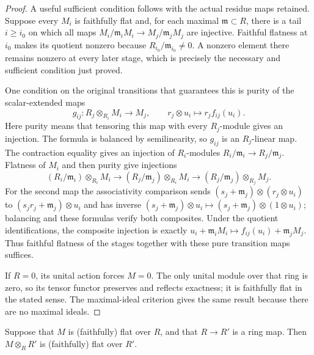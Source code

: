 \begin{proof}
A useful sufficient condition follows with the actual
residue maps retained. Suppose every $M_i$ is faithfully
flat and, for each maximal $\mathfrak m\subset R$, there
is a tail $i\geq i_0$ on which all maps
$M_i/\mathfrak m_iM_i\to M_j/\mathfrak m_jM_j$ are injective.
Faithful flatness at $i_0$ makes its quotient nonzero because
$R_{i_0}/\mathfrak m_{i_0}\ne0$. A nonzero element there
remains nonzero at every later stage, which is precisely
the necessary and sufficient condition just proved.

One condition on the original transitions that guarantees
this is purity of the scalar-extended maps
$$
g_{ij}:R_j\otimes_{R_i}M_i\longrightarrow M_j,
\qquad r_j\otimes u_i\longmapsto r_jf_{ij}(u_i).
$$
Here purity means that tensoring this map with every
$R_j$-module gives an injection. The formula is balanced
by semilinearity, so $g_{ij}$ is an $R_j$-linear map.
The contraction equality gives an injection of
$R_i$-modules $R_i/\mathfrak m_i\to R_j/\mathfrak m_j$.
Flatness of $M_i$ and then purity give injections
$$
(R_i/\mathfrak m_i)\otimes_{R_i}M_i
\longrightarrow (R_j/\mathfrak m_j)\otimes_{R_i}M_i
\longrightarrow (R_j/\mathfrak m_j)\otimes_{R_j}M_j.
$$
For the second map the associativity comparison sends
$(s_j+\mathfrak m_j)\otimes(r_j\otimes u_i)$ to
$(s_jr_j+\mathfrak m_j)\otimes u_i$ and has inverse
$(s_j+\mathfrak m_j)\otimes u_i\mapsto
(s_j+\mathfrak m_j)\otimes(1\otimes u_i)$; balancing and
these formulas verify both composites. Under the quotient
identifications, the composite injection is exactly
$u_i+\mathfrak m_iM_i\mapsto f_{ij}(u_i)+\mathfrak m_jM_j$.
Thus faithful flatness of the stages together with these
pure transition maps suffices.

If $R=0$, its unital action forces $M=0$. The only unital
module over that ring is zero, so its tensor functor
preserves and reflects exactness; it is faithfully flat in
the stated sense. The maximal-ideal criterion gives the
same result because there are no maximal ideals.
\end{proof}

\begin{lemma}
\label{editorial-source-lemma-flat-base-change}
Suppose that $M$ is (faithfully) flat over $R$, and that $R \to R'$
is a ring map. Then $M \otimes_R R'$ is (faithfully) flat over $R'$.
\end{lemma}

